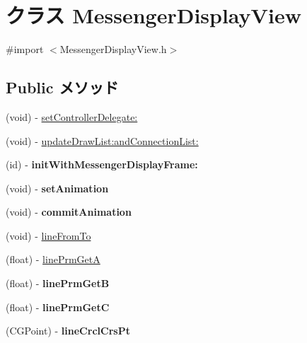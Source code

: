 \hypertarget{interface_messenger_display_view}{
\section{クラス MessengerDisplayView}
\label{d8/d39/interface_messenger_display_view}
}


{\ttfamily \#import $<$MessengerDisplayView.h$>$}

\subsection*{Public メソッド}
\begin{DoxyCompactItemize}
\item 
(void) -\/ \hyperlink{interface_messenger_display_view_ac1aa749dc5f3e7430d8d72841224c919}{setControllerDelegate:}
\item 
(void) -\/ \hyperlink{interface_messenger_display_view_a3790ae1de28d367eb7ec15ec8ed545fb}{updateDrawList:andConnectionList:}
\item 
\hypertarget{interface_messenger_display_view_a35cd00c1a534e3f94111e8ba45bd9cc6}{
(id) -\/ {\bfseries initWithMessengerDisplayFrame:}}
\label{d8/d39/interface_messenger_display_view_a35cd00c1a534e3f94111e8ba45bd9cc6}

\item 
\hypertarget{interface_messenger_display_view_a59ab35bd5336dd47f2ae7782e79c0ee7}{
(void) -\/ {\bfseries setAnimation}}
\label{d8/d39/interface_messenger_display_view_a59ab35bd5336dd47f2ae7782e79c0ee7}

\item 
\hypertarget{interface_messenger_display_view_a0420927cb1db6723109a55e248d960ce}{
(void) -\/ {\bfseries commitAnimation}}
\label{d8/d39/interface_messenger_display_view_a0420927cb1db6723109a55e248d960ce}

\item 
(void) -\/ \hyperlink{interface_messenger_display_view_abb984db49dc97bad42145686da9b9251}{lineFromTo}
\item 
(float) -\/ \hyperlink{interface_messenger_display_view_ac1379b56ac2e7d2b572e147e81971e90}{linePrmGetA}
\item 
\hypertarget{interface_messenger_display_view_a71965f56d6a2665d3f71b0c4ecfe13d0}{
(float) -\/ {\bfseries linePrmGetB}}
\label{d8/d39/interface_messenger_display_view_a71965f56d6a2665d3f71b0c4ecfe13d0}

\item 
\hypertarget{interface_messenger_display_view_ad3b01c0e203aaec5c631091448026ad8}{
(float) -\/ {\bfseries linePrmGetC}}
\label{d8/d39/interface_messenger_display_view_ad3b01c0e203aaec5c631091448026ad8}

\item 
\hypertarget{interface_messenger_display_view_a85472d3e727eb4b6a41ad9f71b83f4f7}{
(CGPoint) -\/ {\bfseries lineCrclCrsPt}}
\label{d8/d39/interface_messenger_display_view_a85472d3e727eb4b6a41ad9f71b83f4f7}

\end{DoxyCompactItemize}
